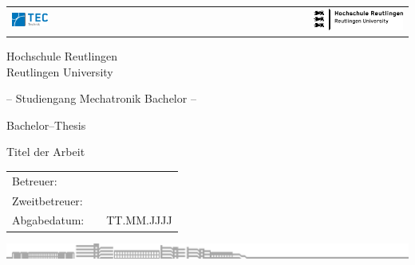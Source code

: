 \begin{titlepage}

\thispagestyle{empty}
%
\begin{tabular}[t]{lp{}r}
%
\includegraphics[width = 0.25\textwidth]{images/Logo_HSRT_TEC_RGB.png}
%
&&\includegraphics[width = 0.4\textwidth]{images/Logo_HSRT_Schwarz.jpg}
%
\end{tabular}
%

\renewcommand{\baselinestretch}{1.2}

\vspace{2cm}

\begin{center}

\sf\huge{Hochschule Reutlingen}\\
\sf\Large{Reutlingen University}\\

\vspace{2cm}

\sf\Large{-- Studiengang Mechatronik Bachelor --}\\
%
\vspace{0.5cm}

\sf\Large{Bachelor--Thesis}

\vspace{2cm}

{\sf\huge{Titel der Arbeit}}\\

\end{center}

\vspace{3cm}

%

\vspace{2cm}

\begin{tabular}{lp{0.5cm}l}
%
Betreuer:				&&		\\
Zweitbetreuer:			&&		\\
Abgabedatum:			&&TT.MM.JJJJ
%
\end{tabular}

\renewcommand{\baselinestretch}{1}
%

\vfill
%

\includegraphics[width = \textwidth]{images/Silhouette_HSRT_045K.jpg}
%
\newpage
\ 
\thispagestyle{empty}
%
\end{titlepage}

